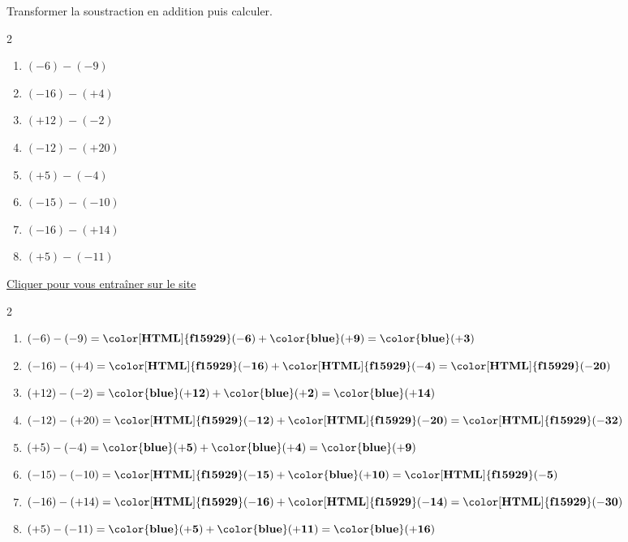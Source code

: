\begin{exercice*}
    Transformer la soustraction en addition puis calculer.
    \begin{multicols}2
        \begin{enumerate}            
            \item $ (-6) - (-9) $
            \item $ (-16) - (+4) $
            \item $ (+12) - (-2) $
            \item $ (-12) - (+20) $
            \item $ (+5) - (-4) $
            \item $ (-15) - (-10) $
            \item $ (-16) - (+14) $
            \item $ (+5) - (-11) $
        \end{enumerate}
    \end{multicols}

    \href{https://coopmaths.fr/mathalea.html?ex=5R21,s=20,s2=false,n=10,cd=1,i=1&v=ex&z=1}{Cliquer pour vous entraîner sur le site \mathaleaLogo} 
\end{exercice*}
\begin{corrige}
    \phantom{rrr}    
    \begin{multicols}2
        \begin{enumerate}
            \item $ (-6) - (-9) = \mathbf{{\color[HTML]{f15929}(-6)}} + \mathbf{{\color{blue}(+9)}} = \mathbf{{\color{blue}(+3)}} $
            \item $ (-16) - (+4) = \mathbf{{\color[HTML]{f15929}(-16)}} + \mathbf{{\color[HTML]{f15929}(-4)}} = \mathbf{{\color[HTML]{f15929}(-20)}} $
            \item $ (+12) - (-2) = \mathbf{{\color{blue}(+12)}} + \mathbf{{\color{blue}(+2)}} = \mathbf{{\color{blue}(+14)}} $
            \item $ (-12) - (+20) = \mathbf{{\color[HTML]{f15929}(-12)}} + \mathbf{{\color[HTML]{f15929}(-20)}} = \mathbf{{\color[HTML]{f15929}(-32)}} $
            \item $ (+5) - (-4) = \mathbf{{\color{blue}(+5)}} + \mathbf{{\color{blue}(+4)}} = \mathbf{{\color{blue}(+9)}} $
            \item $ (-15) - (-10) = \mathbf{{\color[HTML]{f15929}(-15)}} + \mathbf{{\color{blue}(+10)}} = \mathbf{{\color[HTML]{f15929}(-5)}} $
            \item $ (-16) - (+14) = \mathbf{{\color[HTML]{f15929}(-16)}} + \mathbf{{\color[HTML]{f15929}(-14)}} = \mathbf{{\color[HTML]{f15929}(-30)}} $
            \item $ (+5) - (-11) = \mathbf{{\color{blue}(+5)}} + \mathbf{{\color{blue}(+11)}} = \mathbf{{\color{blue}(+16)}} $
        \end{enumerate}
    \end{multicols}
\end{corrige}